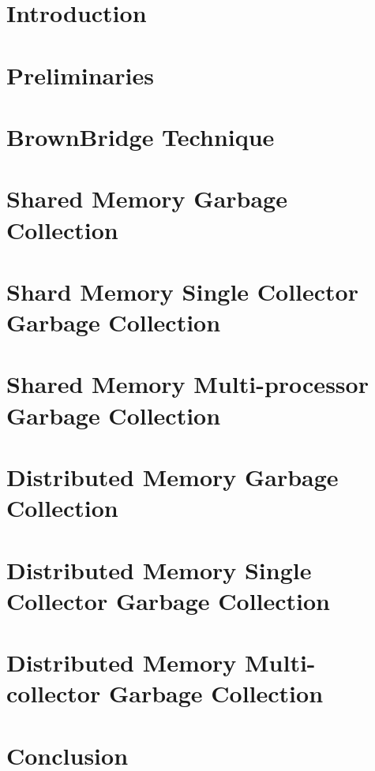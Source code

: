 \documentclass[12pt,letterpaper]{report}
\begin{document}
\begin{doublespace}
\begin{comment}
 
%

\end{comment}

\chapter{Introduction}
\chapter{Preliminaries}
\chapter{BrownBridge Technique}
\chapter {Shared Memory Garbage Collection}
\chapter {Shard Memory Single Collector Garbage Collection} 
  \chapter{Shared Memory Multi-processor Garbage Collection}
 \label{shared}
   
\chapter{Distributed Memory Garbage Collection}
\chapter{Distributed Memory Single Collector Garbage Collection}
  \chapter{Distributed Memory Multi-collector Garbage Collection}
     \label{distributed}
     
\chapter{Conclusion}
  \end{doublespace}

\newpage 




%

\begin{singlespace}


\end{singlespace}


\newpage 
  \begin{doublespace}

  \end{doublespace}
\end{document}
